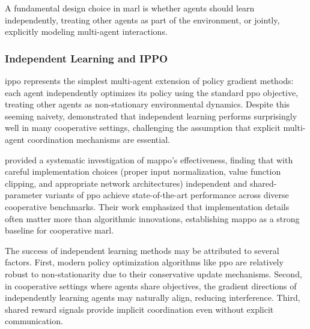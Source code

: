 A fundamental design choice in \gls{marl} is whether agents should 
learn independently, treating other agents as part of the environment, 
or jointly, explicitly modeling multi-agent interactions.

\subsubsection{Independent Learning and IPPO}

\Gls{ippo} represents the simplest multi-agent extension of policy gradient methods: 
each agent independently optimizes its policy using the standard \gls{ppo} objective, 
treating other agents as non-stationary environmental dynamics. 
Despite this seeming naivety, \cite{witt2020} demonstrated that independent 
learning performs surprisingly well in many cooperative settings, challenging the 
assumption that explicit multi-agent coordination mechanisms are essential.

\cite{yu2022} provided a systematic investigation of \gls{mappo}'s effectiveness, 
finding that with careful implementation choices (proper input normalization, 
value function clipping, and appropriate network architectures)
independent and shared-parameter variants of \gls{ppo} achieve 
state-of-the-art performance across diverse cooperative benchmarks. 
Their work emphasized that implementation details often matter 
more than algorithmic innovations, establishing \gls{mappo} 
as a strong baseline for cooperative \gls{marl}.

The success of independent learning methods may be attributed to several factors. 
First, modern policy optimization algorithms like \gls{ppo} are relatively robust 
to non-stationarity due to their conservative update mechanisms. Second, 
in cooperative settings where agents share objectives, the gradient directions 
of independently learning agents may naturally align, reducing interference. 
Third, shared reward signals provide implicit coordination even without 
explicit communication.



